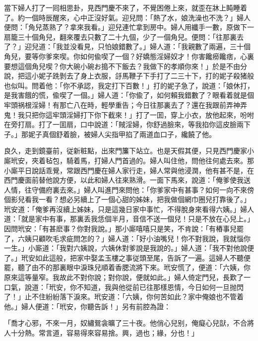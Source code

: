 當下婦人打了一囘相思卦，見西門慶不來了，不覺困倦上來，就歪在牀上盹睡着了。約一個時辰醒來，心中正沒好氣。迎兒問：「熱了水，娘洗澡也不洗？」婦人便問：「角兒蒸熟了？拿來我看。」迎兒連忙拿到房中。婦人用纖手一數，原做下一扇籠三十個角兒，翻來覆去只數了二十九個，少了一個角兒。便問：「往那裏去了？」迎兒道：「我並没看見，只怕娘錯數了。」婦人道：「我親數了兩遍，三十個角兒，要等你爹來喫。你如何偸喫了一個？好嬌態淫婦奴才！你害饞癆饞痞，心裏要想這個角兒喫？你大碗小碗お搗不下飯去？我做下的孝順你來！」於是不由分說，把這小妮子跣剝去了身上衣服，㧱馬鞭子下手打了二三十下，打的妮子殺猪般也似叫。問着他：「你不承認，我定打下百數！」打的妮子急了，說道：「娘休打，是我害餓的慌，偸喫了一個。」婦人道：「你偸了，如何賴我錯數了？眼看着就是個牢頭祸根淫婦！有那亡八在時，輕學重告；今日往那裏去了？還在我跟前弄神弄鬼！我只把你這牢頭淫婦打下你下截來！」打了一囬，穿上小衣，放他起來，吩咐在旁打扇。打了一囬扇，口中說道：「賊淫婦，你舒過臉來，等我掐你這皮臉兩下子。」那妮子真個舒着臉，被婦人尖指甲掐了兩道血口子，纔饒了他。

良久，走到鏡臺前，従新粧點，出來門簾下站立。也是天假其便，只見西門慶家小廝玳安，夾着毡包，騎着馬，打婦人門首過的。婦人叫住他，問他往何處去來。那小廝平日說話乖覺，常跟西門慶在婦人家行走，婦人常與他浸潤，他有甚不是，在西門慶面前替他說方便，以此和婦人往來熟滑。一面下馬來，說道：「俺爹使我送人情，往守備府裏去來。」婦人叫進門來問他：「你爹家中有甚事？如何一向不來傍個影兒看我一看？想必另續上了一個心甜的姊妹，把我做個網巾圈兒打靠後了。」玳安道：「俺爹再沒續上姊妹，只是這幾日家中事忙，不得脫身來看得六姨。」婦人道：「就是家中有事，那裏丢我恁個半月，音信不送一個兒！只是不放在心兒上。」因問玳安：「有甚麽事？你對我說。」那小廝嘻嘻只是笑，不肯說：「有樁事兒罷了，六姨只顧吹毛求疵問怎的？」婦人道：「好小油嘴兒！你不對我說，我就惱你一生。」小廝道：「我對六姨說，六姨休對爹說是我說的。」婦人道：「我不對他說便了。」玳安如此這般，把家中娶孟玉樓之事従頭至尾，告訴了一遍。這婦人不聽便罷，聽了由不的那裏眼中淚珠兒順着香腮流將下來。玳安慌了，便道：「六姨，你原來這等量窄。我故此不對你說；對你說，便就如此。」婦人倚定門兒，長歎了一口氣，說道：「玳安，你不知道，我與他從前已往那樣恩情，今日如何一旦抛閃了！」止不住紛紛落下淚來。玳安道：「六姨，你何苦如此？家中俺娘也不管着他。」婦人便道：「玳安，你聽告訴！」另有前腔為證：

\begin{myquote}
「喬才心邪，不來一月，奴繡鴛衾曠了三十夜。他俏心兒别，俺癡心兒獃，不合將人十分熱。常言道，容易得來容易捨。興，過也；緣，分也！」
\end{myquote}

